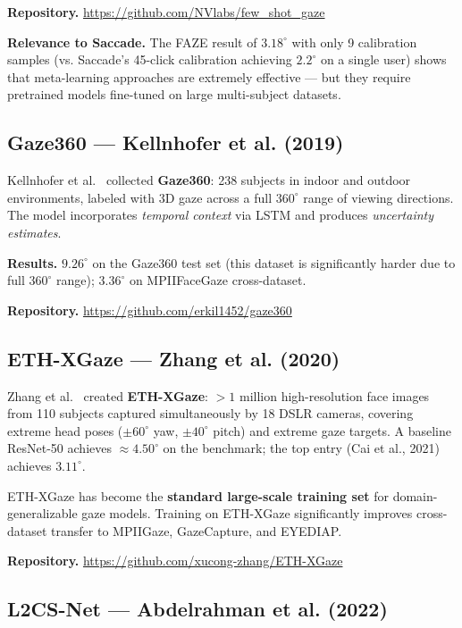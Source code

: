 \documentclass[11pt,a4paper]{article}
\begin{document}
\textbf{Repository.} \url{https://github.com/NVlabs/few_shot_gaze}

\textbf{Relevance to Saccade.} The FAZE result of $3.18^\circ$ with only 9 calibration samples (vs. Saccade's 45-click calibration achieving $2.2^\circ$ on a single user) shows that meta-learning approaches are extremely effective --- but they require pretrained models fine-tuned on large multi-subject datasets.

\subsection{Gaze360 --- Kellnhofer et al. (2019)}

Kellnhofer et al.~\cite{kellnhofer2019gaze360} collected \textbf{Gaze360}: 238 subjects in indoor and outdoor environments, labeled with 3D gaze across a full $360^\circ$ range of viewing directions.
The model incorporates \textit{temporal context} via LSTM and produces \textit{uncertainty estimates}.

\textbf{Results.} $9.26^\circ$ on the Gaze360 test set (this dataset is significantly harder due to full $360^\circ$ range); $3.36^\circ$ on MPIIFaceGaze cross-dataset.

\textbf{Repository.} \url{https://github.com/erkil1452/gaze360}

\subsection{ETH-XGaze --- Zhang et al. (2020)}

Zhang et al.~\cite{zhang2020ethxgaze} created \textbf{ETH-XGaze}: $>1$ million high-resolution face images from 110 subjects captured simultaneously by 18 DSLR cameras, covering extreme head poses ($\pm60^\circ$ yaw, $\pm40^\circ$ pitch) and extreme gaze targets.
A baseline ResNet-50 achieves ${\approx}4.50^\circ$ on the benchmark; the top entry (Cai et al., 2021) achieves $3.11^\circ$.

ETH-XGaze has become the \textbf{standard large-scale training set} for domain-generalizable gaze models.
Training on ETH-XGaze significantly improves cross-dataset transfer to MPIIGaze, GazeCapture, and EYEDIAP.

\textbf{Repository.} \url{https://github.com/xucong-zhang/ETH-XGaze}

\subsection{L2CS-Net --- Abdelrahman et al. (2022)}
\end{document}
